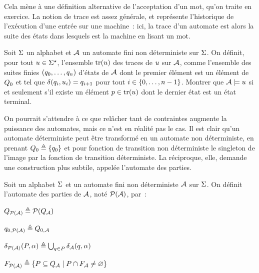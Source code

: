Cela mène à une définition alternative de l'acceptation d'un mot, qu'on traite
en exercice. La notion de trace est assez générale, et représente l'historique
de l'exécution d'une entrée sur une machine~: ici, la trace d'un automate est
alors la suite des états dans lesquels est la machine en lisant un mot.

\begin{exercise}\label{exo.traces.auto}
  Soit $\Sigma$ un alphabet et $\mathcal{A}$ un automate fini non déterministe sur
  $\Sigma$. On définit, pour tout $u \in \Sigma^{\star}$, l'ensemble $\operatorname{tr}(u)$
  des traces de $u$ sur $\mathcal{A}$, comme l'ensemble des suites finies
  $(q_{0},\ldots,q_{n})$ d'états de $\mathcal{A}$ dont le premier élément
  est un élément de $Q_{0}$ et tel que $\delta_{}(q_{i},u_i) = q_{i+1}$
  pour tout $i \in \{0,\ldots,n - 1\}$. Montrer que $\mathcal{A} \models u$ si et
  seulement s'il existe un élément $p \in \operatorname{tr}(u)$ dont le dernier état est
  un état terminal.
\end{exercise}

On pourrait s'attendre à ce que relâcher tant de contraintes augmente la
puissance des automates, mais ce n'est en réalité pas le cas. Il est clair qu'un
automate déterministe peut être transformé en un automate non déterministe, en
prenant $Q_{0} \triangleq \{q_{0}\}$ et pour fonction de transition non
déterministe le singleton de l'image par la fonction de transition déterministe.
La réciproque, elle, demande une construction plus subtile, appelée l'automate
des parties.

\begin{definition}
  Soit un alphabet $\Sigma$ et un automate fini non déterministe $\mathcal{A}$ sur
  $\Sigma$. On définit l'automate des parties de $\mathcal{A}$, noté
  $\mathcal{P}(\mathcal{A})$, par~:
  \vspace{0.1cm}
  \begin{itemize}
    \begin{minipage}{0.45\textwidth}
    \item $Q_{\mathcal{P}(\mathcal{A})} \triangleq \mathcal{P}(Q_{\mathcal{A}})$
    \item $q_{0,\mathcal{P}(\mathcal{A})} \triangleq Q_{0,\mathcal{A}}$
    \end{minipage}
    \begin{minipage}{0.45\textwidth}
      \item $\delta_{\mathcal{P}(\mathcal{A})} (P,\alpha) \triangleq
        \bigcup_{q_{} \in P} \delta_{\mathcal{A}}(q_{},\alpha)$
      \item $F_{\mathcal{P}(\mathcal{A})} \triangleq
        \left\{ P \subseteq Q_{\mathcal{A}} \;\middle\vert\; P\cap F_{\mathcal{A}} \neq \varnothing \right\}$
    \end{minipage}
  \end{itemize}
\end{definition}

